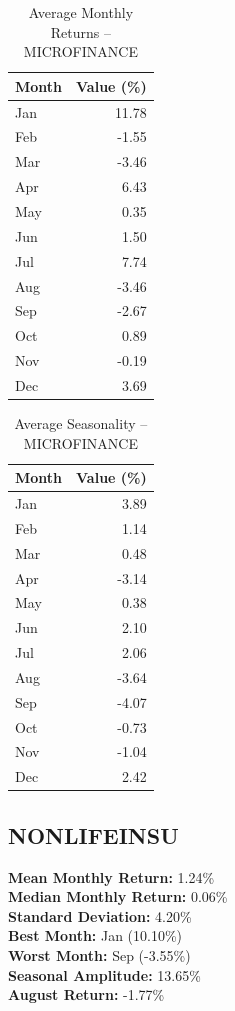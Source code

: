 \documentclass[12pt]{article}
\begin{document}
\begin{table}[h!]
\centering
\caption{Average Monthly Returns -- MICROFINANCE}
\begin{tabular}{l r}
\toprule
Month & Value (\%) \\
\midrule
Jan & 11.78 \\
Feb & -1.55 \\
Mar & -3.46 \\
Apr & 6.43 \\
May & 0.35 \\
Jun & 1.50 \\
Jul & 7.74 \\
Aug & -3.46 \\
Sep & -2.67 \\
Oct & 0.89 \\
Nov & -0.19 \\
Dec & 3.69 \\
\bottomrule
\end{tabular}
\end{table}

\begin{table}[h!]
\centering
\caption{Average Seasonality -- MICROFINANCE}
\begin{tabular}{l r}
\toprule
Month & Value (\%) \\
\midrule
Jan & 3.89 \\
Feb & 1.14 \\
Mar & 0.48 \\
Apr & -3.14 \\
May & 0.38 \\
Jun & 2.10 \\
Jul & 2.06 \\
Aug & -3.64 \\
Sep & -4.07 \\
Oct & -0.73 \\
Nov & -1.04 \\
Dec & 2.42 \\
\bottomrule
\end{tabular}
\end{table}


\clearpage

\subsection{NONLIFEINSU}
\textbf{Mean Monthly Return:} 1.24\% \\
\textbf{Median Monthly Return:} 0.06\% \\
\textbf{Standard Deviation:} 4.20\% \\
\textbf{Best Month:} Jan (10.10\%) \\
\textbf{Worst Month:} Sep (-3.55\%) \\
\textbf{Seasonal Amplitude:} 13.65\% \\
\textbf{August Return:} -1.77\% \\
\end{document}
